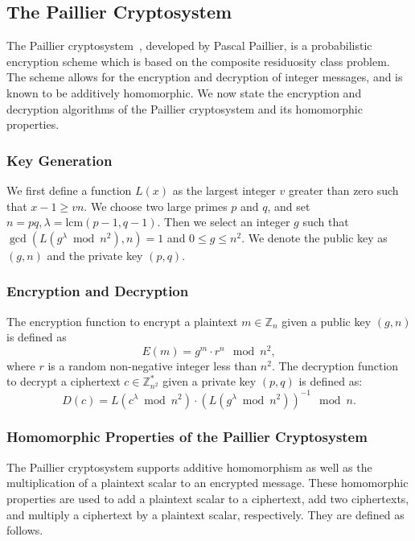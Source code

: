 \subsection{The Paillier Cryptosystem}
The Paillier cryptosystem~\cite{stern_public-key_1999}, developed by Pascal Paillier, is a probabilistic encryption scheme which is based on the composite residuosity class problem. The scheme allows for the encryption and decryption of integer messages, and is known to be additively homomorphic. We now state the encryption and decryption algorithms of the Paillier cryptosystem and its homomorphic properties.

\subsubsection{Key Generation}
We first define a function $L\left(x\right)$ as the largest integer $v$ greater than zero such that $x-1 \geq vn$.
We choose two large primes $p$ and $q$, and set $n = pq, \lambda = \mathrm{lcm}\left(p-1,q-1\right)$.
Then we select an integer $g$ such that $\gcd\left(L\left(g^\lambda \bmod n^2\right), n\right) = 1$ and $0\leq g \leq n^2$.
We denote the public key as $(g,n)$ and the private key $(p,q)$.
\subsubsection{Encryption and Decryption}
The encryption function to encrypt a plaintext $m \in \mathbb{Z}_n$ given a public key $(g,n)$ is defined as
\begin{equation*}
	E\left(m\right) = g^m \cdot r^n \mod{n^2},
\end{equation*}
where $r$ is a random non-negative integer less than $n^2$.
The decryption function to decrypt a ciphertext $c \in \mathbb{Z}^*_{n^2}$ given a private key $(p,q)$ is defined as:
\begin{equation*}
	D\left(c\right) = L\left(c^\lambda \bmod n^2\right) \cdot \left(L\left(g^\lambda \bmod n^2\right)\right)^{-1} \mod n.
\end{equation*}
\subsubsection{Homomorphic Properties of the Paillier Cryptosystem}
The Paillier cryptosystem supports additive homomorphism as well as the multiplication of a plaintext scalar to an encrypted message. These homomorphic properties are used to add a plaintext scalar to a ciphertext, add two ciphertexts, and multiply a ciphertext by a plaintext scalar, respectively. They are defined as follows.

